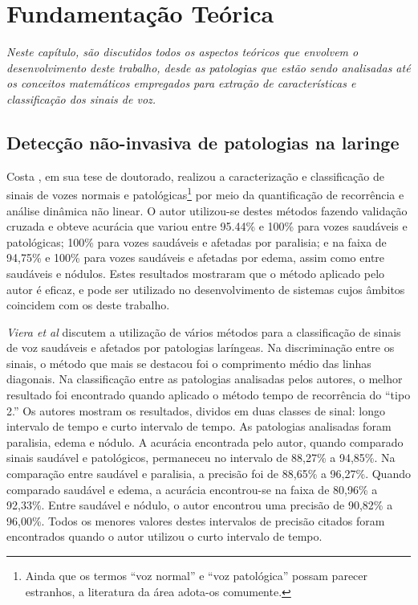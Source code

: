 \documentclass[a4paper,12pt,oneside]{report}
\begin{document}
\chapter{Fundamenta\c{c}\~{a}o Te\'{o}rica}
\label{chapter:fundamentacao_teorica}
\emph{Neste cap\'{i}tulo, s\~{a}o discutidos todos os aspectos te\'{o}ricos que envolvem o desenvolvimento deste trabalho, desde as patologias que est\~{a}o sendo analisadas at\'{e} os conceitos matem\'{a}ticos empregados para extra\c{c}\~{a}o de caracter\'{i}sticas e classifica\c{c}\~{a}o dos sinais de voz.}
\section{Detec\c{c}\~{a}o n\~{a}o-invasiva de patologias na laringe}
\hspace*{+15pt} Costa \cite{costa_doutorado}, em sua tese de doutorado, realizou a caracteriza\c{c}\~{a}o e classifica\c{c}\~{a}o de sinais de vozes normais e patol\'{o}gicas\footnote{Ainda que os termos ``voz normal'' e ``voz patol\'{o}gica'' possam parecer estranhos, a literatura da \'{a}rea adota-os comumente.} por meio da quantifica\c{c}\~{a}o de recorr\^{e}ncia e an\'{a}lise di\-n\^{a}\-mi\-ca n\~{a}o linear. O autor utilizou-se destes m\'{e}todos fazendo valida\c{c}\~{a}o cruzada e obteve acur\'{a}cia que variou entre 95.44\% e 100\% para vozes saud\'{a}veis e patol\'{o}gicas; 100\% para vozes saud\'{a}veis e afetadas por paralisia; e na faixa de 94,75\% e 100\% para vozes saud\'{a}veis e afetadas por edema, assim como entre saud\'{a}veis e n\'{o}dulos. Estes resultados mostraram que o m\'{e}todo aplicado pelo autor \'{e} eficaz, e pode ser utilizado no desenvolvimento de sistemas cujos \^{a}mbitos coincidem com os deste trabalho.
\\
\par \emph{Viera et al} \cite{vieira_outros} discutem a utiliza\c{c}\~{a}o de v\'{a}rios m\'{e}todos para a classifica\c{c}\~{a}o de sinais de voz saud\'{a}veis e afetados por patologias lar\'{i}ngeas. Na discrimina\c{c}\~{a}o entre os sinais, o m\'{e}todo que mais se destacou foi o comprimento m\'{e}dio das linhas diagonais. Na classifica\c{c}\~{a}o entre as patologias analisadas pelos autores, o melhor resultado foi encontrado quando aplicado o m\'{e}todo tempo de recorr\^{e}ncia do ``tipo 2.'' Os autores mostram os resultados, dividos em duas classes de sinal: longo intervalo de tempo e curto intervalo de tempo. As patologias analisadas foram paralisia, edema e n\'{o}dulo. A acur\'{a}cia encontrada pelo autor, quando comparado sinais saud\'{a}vel e patol\'{o}gicos, permaneceu no intervalo de 88,27\% a 94,85\%.  Na compara\c{c}\~{a}o entre saud\'{a}vel e paralisia, a precis\~{a}o foi de 88,65\% a 96,27\%. Quando comparado saud\'{a}vel e edema, a acur\'{a}cia encontrou-se na faixa de 80,96\% a 92,33\%. Entre saud\'{a}vel e n\'{o}dulo, o autor encontrou uma precis\~{a}o de 90,82\% a 96,00\%. Todos os menores valores destes intervalos de precis\~{a}o citados foram encontrados quando o autor utilizou o curto intervalo de tempo. 	
\end{document}
